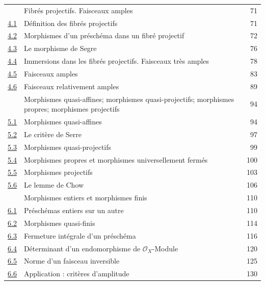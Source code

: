 \begin{longtable}{@{}p{}p{}r@{}}
\hyperref[section:II.4-fr]{\textsection4} & Fibrés projectifs. Faisceaux amples & 71\\
\hyperref[subsection:II.4.1-fr]{4.1} & Définition des fibrés projectifs & 71\\
\hyperref[subsection:II.4.2-fr]{4.2} & Morphismes d'un préschéma dans un fibré projectif & 72\\
\hyperref[subsection:II.4.3-fr]{4.3} & Le morphisme de Segre & 76\\
\hyperref[subsection:II.4.4-fr]{4.4} & Immersions dans les fibrés projectifs. Faisceaux très amples & 78\\
\hyperref[subsection:II.4.5-fr]{4.5} & Faisceaux amples & 83\\
\hyperref[II.4.6-fr]{4.6} & Faisceaux relativement amples & 89\\
\hyperref[section:II.5-fr]{\textsection5} & Morphismes quasi-affines; morphismes quasi-projectifs; morphismes propres; morphismes projectifs & 94\\
\hyperref[subsection:II.5.1-fr]{5.1} & Morphismes quasi-affines & 94\\
\hyperref[subsection:II.5.2-fr]{5.2} & Le critère de Serre & 97\\
\hyperref[subsection:II.5.3-fr]{5.3} & Morphismes quasi-projectifs & 99\\
\hyperref[subsection:II.5.4-fr]{5.4} & Morphismes propres et morphismes universellement fermés & 100\\
\hyperref[subsection:II.5.5-fr]{5.5} & Morphismes projectifs & 103\\
\hyperref[subsection:II.5.6-fr]{5.6} & Le lemme de Chow & 106\\
\hyperref[section:II.6-fr]{\textsection6} & Morphismes entiers et morphismes finis & 110\\
\hyperref[subsection:II.6.1-fr]{6.1} & Préschémas entiers sur un autre & 110\\
\hyperref[subsection:II.6.2-fr]{6.2} & Morphismes quasi-finis & 114\\
\hyperref[subsection:II.6.3-fr]{6.3} & Fermeture intégrale d'un préschéma & 116\\
\hyperref[subsection:II.6.4-fr]{6.4} & Déterminant d'un endomorphisme de $\mathcal{O}_X$-Module & 120\\
\hyperref[subsection:II.6.5-fr]{6.5} & Norme d'un faisceau inversible & 125\\
\hyperref[subsection:II.6.6-fr]{6.6} & Application : critères d'amplitude & 130\\

\end{longtable}
